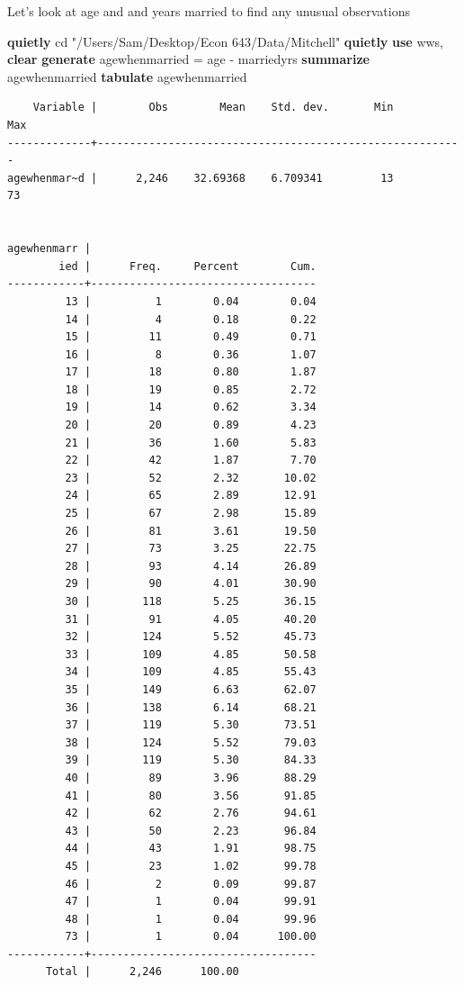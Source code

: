 \documentclass[
]{book}
\newenvironment{Shaded}{\begin{snugshade}}{\end{snugshade}}
\newcommand{\KeywordTok}[1]{\textcolor[rgb]{0.13,0.29,0.53}{\textbf{#1}}}
\newcommand{\NormalTok}[1]{#1}
\newcommand{\StringTok}[1]{\textcolor[rgb]{0.31,0.60,0.02}{#1}}
\begin{document}
Let's look at age and and years married to find any unusual observations

\begin{Shaded}
\begin{Highlighting}[]
\KeywordTok{quietly}\NormalTok{ cd }\StringTok{"/Users/Sam/Desktop/Econ 643/Data/Mitchell"}
\KeywordTok{quietly} \KeywordTok{use}\NormalTok{ wws, }\KeywordTok{clear}
\KeywordTok{generate}\NormalTok{ agewhenmarried = age {-} marriedyrs}
\KeywordTok{summarize}\NormalTok{ agewhenmarried }
\KeywordTok{tabulate}\NormalTok{ agewhenmarried}
\end{Highlighting}
\end{Shaded}

\begin{verbatim}
    Variable |        Obs        Mean    Std. dev.       Min        Max
-------------+---------------------------------------------------------
agewhenmar~d |      2,246    32.69368    6.709341         13         73


agewhenmarr |
        ied |      Freq.     Percent        Cum.
------------+-----------------------------------
         13 |          1        0.04        0.04
         14 |          4        0.18        0.22
         15 |         11        0.49        0.71
         16 |          8        0.36        1.07
         17 |         18        0.80        1.87
         18 |         19        0.85        2.72
         19 |         14        0.62        3.34
         20 |         20        0.89        4.23
         21 |         36        1.60        5.83
         22 |         42        1.87        7.70
         23 |         52        2.32       10.02
         24 |         65        2.89       12.91
         25 |         67        2.98       15.89
         26 |         81        3.61       19.50
         27 |         73        3.25       22.75
         28 |         93        4.14       26.89
         29 |         90        4.01       30.90
         30 |        118        5.25       36.15
         31 |         91        4.05       40.20
         32 |        124        5.52       45.73
         33 |        109        4.85       50.58
         34 |        109        4.85       55.43
         35 |        149        6.63       62.07
         36 |        138        6.14       68.21
         37 |        119        5.30       73.51
         38 |        124        5.52       79.03
         39 |        119        5.30       84.33
         40 |         89        3.96       88.29
         41 |         80        3.56       91.85
         42 |         62        2.76       94.61
         43 |         50        2.23       96.84
         44 |         43        1.91       98.75
         45 |         23        1.02       99.78
         46 |          2        0.09       99.87
         47 |          1        0.04       99.91
         48 |          1        0.04       99.96
         73 |          1        0.04      100.00
------------+-----------------------------------
      Total |      2,246      100.00
\end{verbatim}
\end{document}
